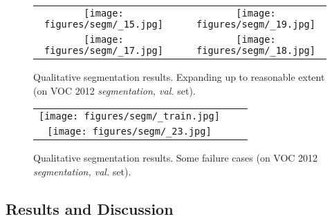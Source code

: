 \documentclass[10pt,twocolumn,letterpaper]{article}
\begin{document}
\begin{figure*}
\begin{center}
\def\arraystretch{0.5}
\begin{tabular}{@{}c@{\hskip 0.01\linewidth}c@{\hskip 0.01\linewidth}c}
\texttt{[image: figures/segm/\_15.jpg]} &&
\texttt{[image: figures/segm/\_19.jpg]} \\
\texttt{[image: figures/segm/\_17.jpg]} &&
\texttt{[image: figures/segm/\_18.jpg]} \\
\end{tabular}
\end{center}
\vspace{-0.2in}
\caption{Qualitative segmentation results. Expanding up to reasonable extent (on VOC 2012 \textit{segmentation, val.} set).}
\label{fig:segm2}
\vspace{-0.1in}
\end{figure*}

\begin{figure}
\begin{center}
\def\arraystretch{0.5}
\begin{tabular}{@{}c@{\hskip 0.01\linewidth}c@{\hskip 0.01\linewidth}c}
\texttt{[image: figures/segm/\_train.jpg]} \\
\texttt{[image: figures/segm/\_23.jpg]} \\
\end{tabular}
\end{center}
\vspace{-0.2in}
\caption{Qualitative segmentation results. Some failure cases (on VOC 2012 \textit{segmentation, val.} set).}
\label{fig:segm3}
\vspace{-0.1in}
\end{figure}


\subsection{Results and Discussion}
\end{document}
